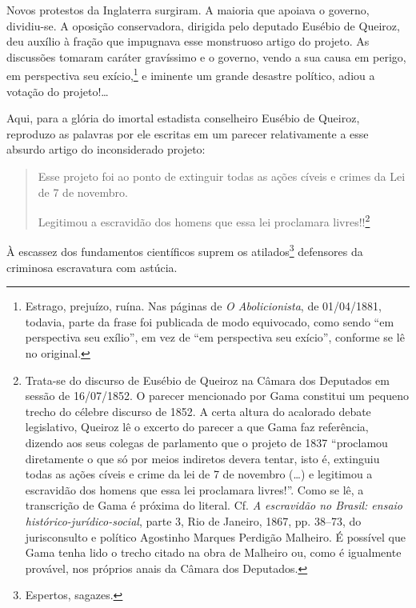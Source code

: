 Novos protestos da Inglaterra surgiram. A maioria que apoiava o governo,
dividiu-se. A oposição conservadora, dirigida pelo deputado Eusébio de
Queiroz, deu auxílio à fração que impugnava esse monstruoso artigo do
projeto. As discussões tomaram caráter gravíssimo e o governo, vendo a
sua causa em perigo, em perspectiva seu exício,\footnote{Estrago,
  prejuízo, ruína. Nas páginas de \emph{O Abolicionista}, de 01/04/1881,
  todavia, parte da frase foi publicada de modo equivocado, como sendo
  ``em perspectiva seu exílio'', em vez de ``em perspectiva seu exício'',
  conforme se lê no original.} e iminente um grande desastre político,
adiou a votação do projeto!\ldots{}

Aqui, para a glória do imortal estadista conselheiro Eusébio de Queiroz,
reproduzo as palavras por ele escritas em um parecer relativamente a
esse absurdo artigo do inconsiderado projeto:

\begin{quote}
Esse projeto foi ao ponto de extinguir todas as ações cíveis e crimes
da Lei de 7 de novembro.

Legitimou a escravidão dos homens que essa lei proclamara
livres!!\footnote{Trata-se do discurso de Eusébio de Queiroz na
  Câmara dos Deputados em sessão de 16/07/1852. O parecer mencionado por
  Gama constitui um pequeno trecho do célebre discurso de 1852. A certa
  altura do acalorado debate legislativo, Queiroz lê o excerto do
  parecer a que Gama faz referência, dizendo aos seus colegas de
  parlamento que o projeto de 1837 ``proclamou diretamente o que só por
  meios indiretos devera tentar, isto é, extinguiu todas as ações cíveis
  e crime da lei de 7 de novembro (\ldots{}) e legitimou a escravidão
  dos homens que essa lei proclamara livres!''. Como se lê, a transcrição
  de Gama é próxima do literal. Cf. \emph{A escravidão no Brasil: ensaio
  histórico-jurídico-social}, parte 3, Rio de Janeiro, 1867, pp. 38--73,
  do jurisconsulto e político Agostinho Marques Perdigão Malheiro. É
 possível que Gama tenha lido o trecho citado na obra de
  Malheiro ou, como é igualmente provável, nos próprios anais da Câmara
  dos Deputados.}
\end{quote}

À escassez dos fundamentos científicos suprem os atilados\footnote{
  Espertos, sagazes.} defensores da criminosa escravatura com astúcia.

